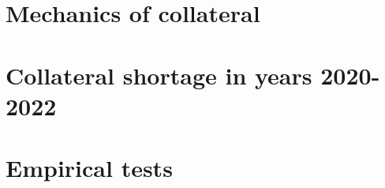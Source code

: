 \documentclass[11pt,a4paper,english,oneside]{article}
\begin{document}
%

\newpage


\section{Mechanics of collateral}

\lipsum


\section{Collateral shortage in years 2020-2022}

\lipsum


\section{Empirical tests}
\end{document}

